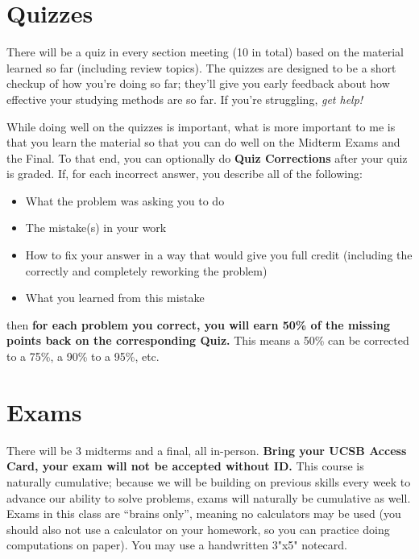 \documentclass[11pt,letterpaper]{article}
\begin{document}
\section*{Quizzes}
There will be a quiz in every section meeting (10 in total) based on the material learned so far (including review topics). The quizzes are designed to be a short checkup of how you're doing so far; they'll give you early feedback about how effective your studying methods are so far. If you're struggling, \textit{get help! }

While doing well on the quizzes is important, what is more important to me is that you learn the material so that you can do well on the Midterm Exams and the Final. To that end, you can optionally do \textbf{Quiz Corrections} after your quiz is graded. If, for each incorrect answer, you describe all of the following:
\begin{itemize}[nosep]
\item What the problem was asking you to do
\item The mistake(s) in your work
\item How to fix your answer in a way that would give you full credit (including the correctly and completely reworking the problem)
\item What you learned from this mistake
\end{itemize}
then \textbf{for each problem you correct, you will earn 50\% of the missing points back on the corresponding Quiz. }This means a 50\% can be corrected to a 75\%, a 90\% to a 95\%, etc. 

\section*{Exams}
There will be 3 midterms and a final, all in-person. \textbf{Bring your UCSB Access Card, your exam will not be accepted without ID.} This course is naturally cumulative; because we will be building on previous skills every week to advance our ability to solve problems, exams will naturally be cumulative as well. Exams in this class are “brains only”, meaning no calculators may be used (you should also not use a calculator on your homework, so you can practice doing computations on paper). You may use a handwritten 3"x5" notecard. 
\end{document}
